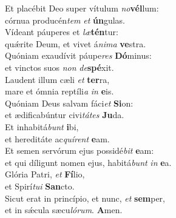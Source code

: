 \evenverse Et placébit Deo super vítulum \textit{no}\textbf{vél}lum:~\*\\
\evenverse córnua producén\textit{tem} \textit{et} \textbf{ún}gulas.\\
\oddverse Vídeant páuperes et \textit{læ}\textbf{tén}tur:~\*\\
\oddverse quǽrite Deum, et vivet á\textit{ni}\textit{ma} \textbf{ve}stra.\\
\evenverse Quóniam exaudívit páupe\textit{res} \textbf{Dó}minus:~\*\\
\evenverse et vinctos suos \textit{non} \textit{de}\textbf{spé}xit.\\
\oddverse Laudent illum cæli \textit{et} \textbf{ter}ra,~\*\\
\oddverse mare et ómnia reptíli\textit{a} \textit{in} \textbf{e}is.\\
\evenverse Quóniam Deus salvam fáci\textit{et} \textbf{Si}on:~\*\\
\evenverse et ædificabúntur civi\textit{tá}\textit{tes} \textbf{Ju}da.\\
\oddverse Et inhabitá\textit{bunt} \textbf{i}bi,~\*\\
\oddverse et hereditáte ac\textit{quí}\textit{rent} \textbf{e}am.\\
\evenverse Et semen servórum ejus possidé\textit{bit} \textbf{e}am:~\*\\
\evenverse et qui díligunt nomen ejus, habitá\textit{bunt} \textit{in} \textbf{e}a.\\
\oddverse Glória Patri, \textit{et} \textbf{Fí}lio,~\*\\
\oddverse et Spirí\textit{tu}\textit{i} \textbf{San}cto.\\
\evenverse Sicut erat in princípio, et nunc, \textit{et} \textbf{sem}per,~\*\\
\evenverse et in sǽcula sæcu\textit{ló}\textit{rum}. \textbf{A}men.\\
